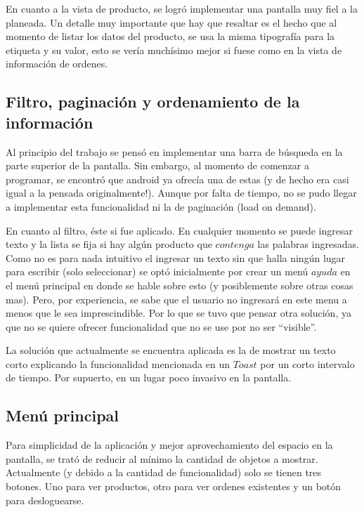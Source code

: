 \documentclass[english]{article}
\begin{document}
En cuanto a la vista de producto, se logró implementar una pantalla
muy fiel a la planeada. Un detalle muy importante que hay que resaltar
es el hecho que al momento de listar los datos del producto, se usa
la misma tipografía para la etiqueta y su valor, esto se vería muchísimo
mejor si fuese como en la vista de información de ordenes.\\



\subsection*{Filtro, paginación y ordenamiento de la información }

Al principio del trabajo se pensó en implementar una barra de búsqueda
en la parte superior de la pantalla. Sin embargo, al momento de comenzar
a programar, se encontró que android ya ofrecía una de estas (y de
hecho era casi igual a la pensada originalmente!). Aunque por falta
de tiempo, no se pudo llegar a implementar esta funcionalidad ni la
de paginación (load on demand).

En cuanto al filtro, éste si fue aplicado. En cualquier momento se
puede ingresar texto y la lista se fija si hay algún producto que
$contenga$ las palabras ingresadas. Como no es para nada intuitivo
el ingresar un texto sin que halla ningún lugar para escribir (solo
seleccionar) se optó inicialmente por crear un menú $ayuda$ en el
menú principal en donde se hable sobre esto (y posiblemente sobre
otras cosas mas). Pero, por experiencia, se sabe que el usuario no
ingresará en este menu a menos que le sea imprescindible. Por lo que
se tuvo que pensar otra solución, ya que no se quiere ofrecer funcionalidad
que no se use por no ser {}``visible''.

La solución que actualmente se encuentra aplicada es la de mostrar
un texto corto explicando la funcionalidad mencionada en un $Toast$
por un corto intervalo de tiempo. Por supuerto, en un lugar poco invasivo
en la pantalla.\\



\subsection*{Menú principal}

Para simplicidad de la aplicación y mejor aprovechamiento del espacio
en la pantalla, se trató de reducir al mínimo la cantidad de objetos
a mostrar. Actualmente (y debido a la cantidad de funcionalidad) solo
se tienen tres botones. Uno para ver productos, otro para ver ordenes
existentes y un botón para desloguearse.
\end{document}
